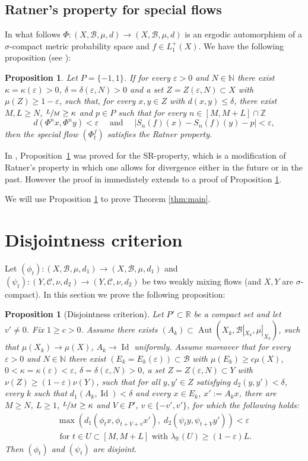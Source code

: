 \documentclass[10pt]{amsart}
\let\mathcal\mathscr
\let\epsilon\varepsilon
\DeclareMathOperator{\Aut}{Aut}
\DeclareMathOperator{\Id}{Id}
\theoremstyle{definition}
\theoremstyle{plain}
\newtheorem{proposition}[definition]{Proposition}
\newcommand\NN{\mathbb{N}}
\newcommand\RR{\mathbb{R}}
\newcommand\ZZ{\mathbb{Z}}
\newcommand\cB{\mathcal{B}}
\newcommand\cC{\mathcal{C}}
\begin{document}
\subsection{Ratner's property for special flows}
In what follows $\Phi:(X,\cB,\mu,d)\to (X,\cB,\mu,d)$ is an ergodic automorphism of a $\sigma$-compact metric probability space and $f\in L_1^{+}(X)$. We have the following proposition (see \cite[Prop.\,4.1]{KK}):
\begin{proposition}\label{prop:specflows} Let $P=\{-1,1\}$. If for every $\epsilon>0$ and $N\in \NN$ there exist $\kappa=\kappa(\epsilon)>0$, $\delta=\delta(\epsilon,N)>0$ and a set $Z=Z(\epsilon,N)\subset X$ with $\mu(Z)\geq 1-\epsilon$, such that, for every $x,y\in Z$ with $d(x,y)\leq \delta$, there exist $M,L\geq N$, $\sfrac{L}{M}\geq \kappa$ and $p\in P$ such that for every $n\in [M,M+L]\cap \ZZ$
\[
d(\Phi^nx,\Phi^ny)< \epsilon\quad \text{ and }\quad |S_{n}(f) (x)-S_{n}(f)(y)-p|<\epsilon,
\]
then the special flow $(\Phi_t^f)$ satisfies the Ratner property.
\end{proposition}
In \cite{KK}, Proposition~\ref{prop:specflows} was proved for the SR-property, which is a modification of Ratner's property in which one allows for divergence either in the future or in the past. However the proof in \cite{KK} immediately extends to a proof of Proposition \ref{prop:specflows}.

We will use Proposition \ref{prop:specflows} to prove Theorem \ref{thm:main}.

\section{Disjointness criterion}\label{sec:disj}
Let $(\phi_t):(X,\cB,\mu,d_1)\to (X,\cB,\mu,d_1)$ and $(\psi_t):(Y,\cC,\nu,d_2)\to (Y,\cC,\nu,d_2)$ be two weakly mixing flows (and $X,Y$ are $\sigma$-compact). In this section we prove the following proposition:

\begin{proposition}[Disjointness criterion]\label{disjoint.flows}
Let $P'\subset \RR$ be a compact set and let $v'\neq 0$. Fix $1\geq c>0$. Assume there exists $(A_k)\subset \Aut(X_k,\cB|_{X_k},\mu|_{X_k})$, such that $\mu(X_k)\to \mu(X)$,
$A_k\to \Id$ uniformly.
Assume moreover that for every $\epsilon>0$ and $N\in \NN$
there exist $(E_k=E_k(\epsilon))\subset \cB$ with $\mu(E_k)\geq c\mu(X)$, $0<\kappa=\kappa(\epsilon)<\epsilon$, $\delta=\delta(\epsilon,N)>0$, a set $Z=Z(\epsilon,N)\subset Y$ with $\nu(Z)\geq (1-\epsilon)\nu(Y)$, such that for all $y,y'\in Z$ satisfying $d_2(y,y')<\delta$, every $k$ such that $d_1(A_k,\Id)<\delta$ and every $x\in E_k$, $x':=A_{k}x$, there are $M\geq N$, $L\geq 1$, $\sfrac{L}{M}\geq \kappa$ and $V\in P'$, $v\in\{-v',v'\}$,
for which the following holds:\vspace*{-5pt}
\begin{multline}\label{forw}
\max(d_1(\phi_tx,\phi_{t+V+v}x'),\;d_2(\psi_ty,\psi_{t+V}y'))<\epsilon\\ \text{ for } t\in U\subset [M,M+L]
\text{ with } \lambda_\RR(U)\geq (1-\epsilon)L.
\end{multline}
Then $(\phi_t)$ and $(\psi_t)$ are disjoint.
\end{proposition}
\end{document}

